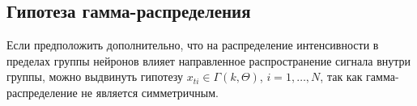 \documentclass[12pt,twoside]{article}
\begin{document}
\subsection{Гипотеза гамма-распределения}
Если предположить дополнительно, что на распределение интенсивности в пределах группы нейронов влияет направленное распространение сигнала внутри группы, можно выдвинуть гипотезу $x_{ti}
\in \Gamma(k, \Theta)$, $i=1,\dots,N$, так как гамма-распределение не является симметричным.







\end{document}
